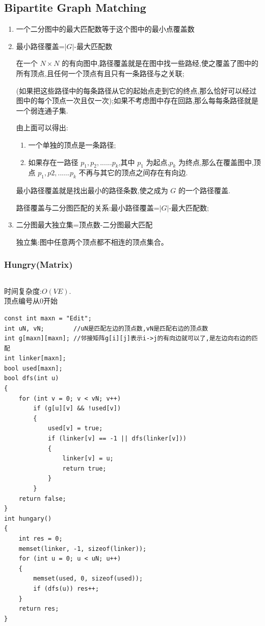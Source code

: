 \documentclass[twoside]{article}
\begin{document}
\subsection{Bipartite Graph Matching}
\begin{enumerate}
\item 一个二分图中的最大匹配数等于这个图中的最小点覆盖数

\item 最小路径覆盖=$|G|$-最大匹配数

在一个 $N \times N$ 的有向图中,路径覆盖就是在图中找一些路经,使之覆盖了图中的所有顶点,且任何一个顶点有且只有一条路径与之关联;

(如果把这些路径中的每条路径从它的起始点走到它的终点,那么恰好可以经过图中的每个顶点一次且仅一次);如果不考虑图中存在回路,那么每每条路径就是一个弱连通子集.

由上面可以得出:

\begin{enumerate}
\item 一个单独的顶点是一条路径;

\item 如果存在一路径 $p_1,p_2,......p_k$,其中 $p_1$ 为起点,$p_k$ 为终点,那么在覆盖图中,顶点 $p_1,p2,......p_k$ 不再与其它的顶点之间存在有向边.
\end{enumerate}

最小路径覆盖就是找出最小的路径条数,使之成为 $G$ 的一个路径覆盖.

路径覆盖与二分图匹配的关系:最小路径覆盖=$|G|$-最大匹配数;

\item 二分图最大独立集=顶点数-二分图最大匹配

独立集:图中任意两个顶点都不相连的顶点集合。
\end{enumerate}
\subsubsection{Hungry(Matrix)}
\begin{lstlisting}
\end{lstlisting}
时间复杂度:$O(VE)$.\\
顶点编号从0开始
\begin{lstlisting}
const int maxn = "Edit";
int uN, vN;        //uN是匹配左边的顶点数,vN是匹配右边的顶点数
int g[maxn][maxn]; //邻接矩阵g[i][j]表示i->j的有向边就可以了,是左边向右边的匹配
int linker[maxn];
bool used[maxn];
bool dfs(int u)
{
    for (int v = 0; v < vN; v++)
        if (g[u][v] && !used[v])
        {
            used[v] = true;
            if (linker[v] == -1 || dfs(linker[v]))
            {
                linker[v] = u;
                return true;
            }
        }
    return false;
}
int hungary()
{
    int res = 0;
    memset(linker, -1, sizeof(linker));
    for (int u = 0; u < uN; u++)
    {
        memset(used, 0, sizeof(used));
        if (dfs(u)) res++;
    }
    return res;
}
\end{lstlisting}
\end{document}
